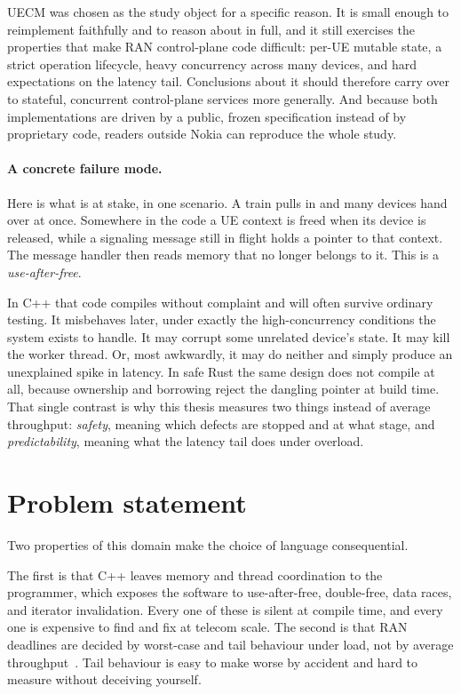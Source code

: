 \documentclass[english,twoside,openright,a4paper,censored,csm,software-track-2020]{HYthesisML}
\begin{document}
UECM was chosen as the study object for a specific reason. It is small enough to reimplement
faithfully and to reason about in full, and it still exercises the properties that make RAN
control-plane code difficult: per-UE mutable state, a strict operation lifecycle, heavy
concurrency across many devices, and hard expectations on the latency tail. Conclusions about
it should therefore carry over to stateful, concurrent control-plane services more generally.
And because both implementations are driven by a public, frozen specification instead of by
proprietary code, readers outside Nokia can reproduce the whole study.

\paragraph{A concrete failure mode.}
Here is what is at stake, in one scenario. A train pulls in and many devices hand over at
once. Somewhere in the code a UE context is freed when its device is released, while a
signaling message still in flight holds a pointer to that context. The message handler then
reads memory that no longer belongs to it. This is a \emph{use-after-free}.

In C++ that code compiles without complaint and will often survive ordinary testing. It
misbehaves later, under exactly the high-concurrency conditions the system exists to handle.
It may corrupt some unrelated device's state. It may kill the worker thread. Or, most
awkwardly, it may do neither and simply produce an unexplained spike in latency. In safe Rust
the same design does not compile at all, because ownership and borrowing reject the dangling
pointer at build time. That single contrast is why this thesis measures two things instead of
average throughput: \emph{safety}, meaning which defects are stopped and at what stage, and
\emph{predictability}, meaning what the latency tail does under overload.

\section{Problem statement}
Two properties of this domain make the choice of language consequential.

The first is that C++ leaves memory and thread coordination to the programmer, which exposes
the software to use-after-free, double-free, data races, and iterator invalidation. Every one
of these is silent at compile time, and every one is expensive to find and fix at telecom
scale. The second is that RAN deadlines are decided by worst-case and tail behaviour under
load, not by average throughput~\cite{dean2013tail}. Tail behaviour is easy to make worse by
accident and hard to measure without deceiving yourself.
\end{document}
